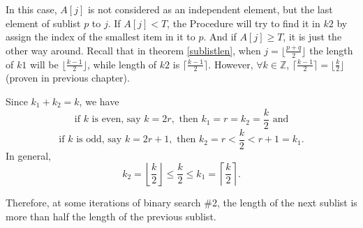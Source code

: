     In this case, $A[j]$ is not considered as an independent element, but the last element of sublist $p$ to $j$.
    If $A[j] < T$, the Procedure will try to find it in $k2$ by assign the index of the smallest item in it 
    to $p$. And if $A[j] \geq T$, it is just the other way around. Recall that in theorem \ref{sublistlen},
    when $j = \lfloor \frac{p+q}{2}\rfloor$ the length of $k1$  will be $\lfloor\frac{k-1}{2}\rfloor$, 
    while length of $k2$ is $\lceil \frac{k-1}{2}\rceil$. However, $\forall k\in \mathbb{Z}$, 
    $\lceil \frac{k-1}{2} \rceil = \lfloor \frac{k}{2}\rfloor$ (proven in previous chapter).

    Since $k_1 + k_2 = k$, we have
    \[
    \text{if } k \text{ is even, say } k = 2r, \text{ then } k_1 = r = k_2 = \frac{k}{2} \text{ and}
    \]
    \[
    \text{if } k \text{ is odd, say } k = 2r + 1, \text{ then } k_2 = r < \frac{k}{2} < r + 1 = k_1.
    \]
    In general,
    \[
    k_2 = \left\lfloor \frac{k}{2} \right\rfloor \leq \frac{k}{2} \leq k_1 = \left\lceil \frac{k}{2} \right\rceil.
    \]

    Therefore, at some iterations of binary search \#2, the length of the next sublist is more than half the length of the previous sublist.


